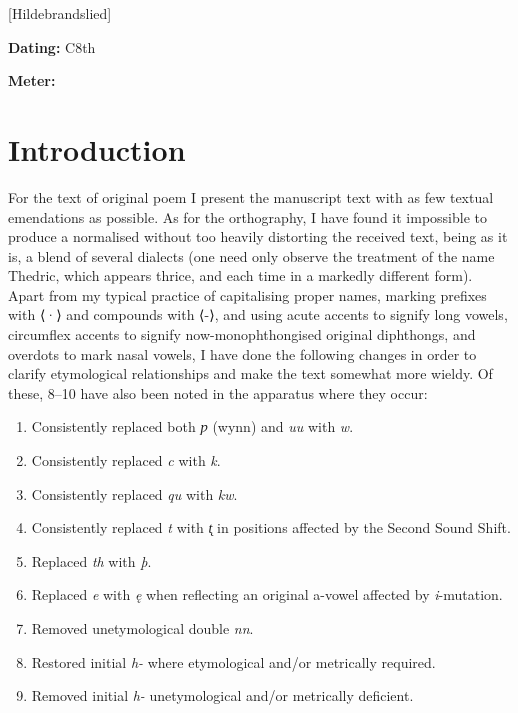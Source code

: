 [Hildebrandslied]
\def\thisBookCode{Hildebrandslied}

\begin{flushright}%
\textbf{Dating:} C8th

\textbf{Meter:} \Fornyrdislag%
\end{flushright}%

\section{Introduction}

For the text of original poem I present the manuscript text with as few textual emendations as possible. As for the orthography, I have found it impossible to produce a normalised without too heavily distorting the received text, being as it is, a blend of several dialects (one need only observe the treatment of the name Thedric, which appears thrice, and each time in a markedly different form). Apart from my typical practice of capitalising proper names, marking prefixes with ⟨·⟩ and compounds with ⟨-⟩, and using acute accents to signify long vowels, circumflex accents to signify now-monophthongised original diphthongs, and overdots to mark nasal vowels, I have done the following changes in order to clarify etymological relationships and make the text somewhat more wieldy. Of these, 8–10 have also been noted in the apparatus where they occur:
\begin{enumerate}
  \item Consistently replaced both \emph{ƿ} (wynn) and \emph{uu} with \emph{w}.
  \item Consistently replaced \emph{c} with \emph{k}.
  \item Consistently replaced \emph{qu} with \emph{kw}.
  \item Consistently replaced \emph{t} with \emph{t̨} in positions affected by the Second Sound Shift.
  \item Replaced \emph{th} with \emph{þ}.
  \item Replaced \emph{e} with \emph{ę} when reflecting an original a-vowel affected by \emph{i}-mutation.
  \item Removed unetymological double \emph{nn}.
  \item Restored initial \emph{h-} where etymological and/or metrically required.
  \item Removed initial \emph{h-} unetymological and/or metrically deficient.
\end{enumerate}

